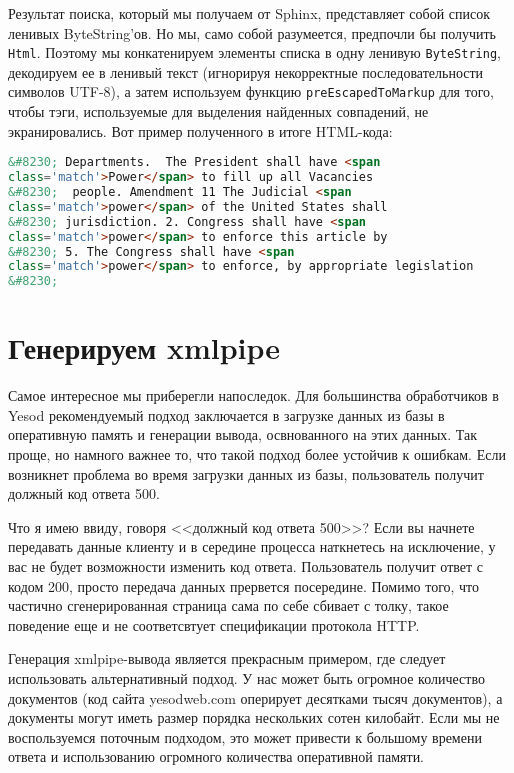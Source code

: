 Результат поиска, который мы получаем от Sphinx, представляет собой список ленивых ByteString'ов. Но мы, само собой разумеется, предпочли бы получить \lstinline'Html'. Поэтому мы конкатенируем элементы списка в одну ленивую \lstinline'ByteString', декодируем ее в ленивый текст (игнорируя некорректные последовательности символов UTF-8), а затем используем функцию \lstinline'preEscapedToMarkup' для того, чтобы тэги, используемые для выделения найденных совпадений, не экранировались. Вот пример полученного в итоге HTML-кода:

\begin{lstlisting}[language=HTML]
&#8230; Departments.  The President shall have <span
class='match'>Power</span> to fill up all Vacancies
&#8230;  people. Amendment 11 The Judicial <span
class='match'>power</span> of the United States shall
&#8230; jurisdiction. 2. Congress shall have <span
class='match'>power</span> to enforce this article by
&#8230; 5. The Congress shall have <span
class='match'>power</span> to enforce, by appropriate legislation
&#8230;
\end{lstlisting}

\section{Генерируем xmlpipe} %

Самое интересное мы приберегли напоследок. Для большинства обработчиков в Yesod рекомендуемый подход заключается в загрузке данных из базы в оперативную память и генерации вывода, освнованного на этих данных. Так проще, но намного важнее то, что такой подход более устойчив к ошибкам.  Если возникнет проблема во время загрузки данных из базы, пользователь получит должный код ответа 500.

Что я имею ввиду, говоря <<должный код ответа 500>>? Если вы начнете передавать данные клиенту и в середине процесса наткнетесь на исключение, у вас не будет возможности изменить код ответа. Пользователь получит ответ с кодом 200, просто передача данных прервется посередине. Помимо того, что частично сгенерированная страница сама по себе сбивает с толку, такое поведение еще и не соответсвтует спецификации протокола HTTP.

Генерация xmlpipe-вывода является прекрасным примером, где следует использовать альтернативный подход. У нас может быть огромное количество документов (код сайта yesodweb.com оперирует десятками тысяч документов), а документы могут иметь размер порядка нескольких сотен килобайт. Если мы не воспользуемся поточным подходом, это может привести к большому времени ответа и использованию огромного количества оперативной памяти.

